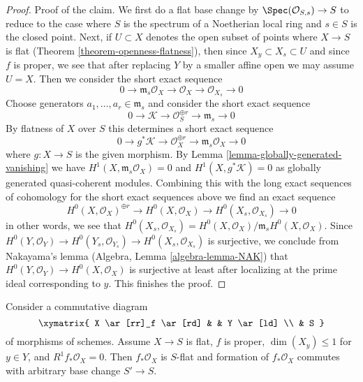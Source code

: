 \begin{proof}
\medskip\noindent
Proof of the claim. We first do a flat base change by
$\Spec(\mathcal{O}_{S, s}) \to S$ to reduce to the case
where $S$ is the spectrum of a Noetherian local ring and
$s \in S$ is the closed point. Next, if $U \subset X$
denotes the open subset of points where $X \to S$ is flat
(Theorem \ref{theorem-openness-flatness}),
then since $X_y \subset X_s \subset U$ and since $f$ is proper, we
see that after replacing $Y$ by a smaller affine open we may
assume $U = X$. Then we consider the short
exact sequence
$$
0 \to \mathfrak m_s\mathcal{O}_X \to \mathcal{O}_X \to \mathcal{O}_{X_s} \to 0
$$
Choose generators $a_1, \ldots, a_r \in \mathfrak m_s$ and consider
the short exact sequence
$$
0 \to \mathcal{K} \to \mathcal{O}_S^{\oplus r} \to \mathfrak m_s \to 0
$$
By flatness of $X$ over $S$ this determines a short exact sequence
$$
0 \to g^*\mathcal{K} \to \mathcal{O}_X^{\oplus r} \to
\mathfrak m_s\mathcal{O}_X \to 0
$$
where $g : X \to S$ is the given morphism.
By Lemma \ref{lemma-globally-generated-vanishing}
we have $H^1(X, \mathfrak m_s\mathcal{O}_X) = 0$ and
$H^1(X, g^*\mathcal{K}) = 0$ as globally generated
quasi-coherent modules. Combining this with the
long exact sequences of cohomology for the short exact
sequences above we find an exact sequence
$$
H^0(X, \mathcal{O}_X)^{\oplus r} \to
H^0(X, \mathcal{O}_X) \to
H^0(X_s, \mathcal{O}_{X_s}) \to 0
$$
in other words, we see that $H^0(X_s, \mathcal{O}_{X_s}) =
H^0(X, \mathcal{O}_X)/\mathfrak m_s H^0(X, \mathcal{O}_X)$.
Since $H^0(Y, \mathcal{O}_Y) \to H^0(Y_s, \mathcal{O}_{Y_s}) \to
H^0(X_s, \mathcal{O}_{X_s})$
is surjective, we conclude from Nakayama's lemma
(Algebra, Lemma \ref{algebra-lemma-NAK}) that
$H^0(Y, \mathcal{O}_Y) \to H^0(X, \mathcal{O}_X)$ is surjective
at least after localizing at the prime ideal corresponding to $y$.
This finishes the proof.
\end{proof}

\begin{lemma}
\label{lemma-h1-fibre-zero-h0-flat}
Consider a commutative diagram
$$
\xymatrix{
X \ar[rr]_f \ar[rd] & & Y \ar[ld] \\
& S
}
$$
of morphisms of schemes. Assume $X \to S$
is flat, $f$ is proper, $\dim(X_y) \leq 1$ for $y \in Y$, and
$R^1f_*\mathcal{O}_X = 0$. Then $f_*\mathcal{O}_X$
is $S$-flat and formation of $f_*\mathcal{O}_X$ commutes
with arbitrary base change $S' \to S$.
\end{lemma}


